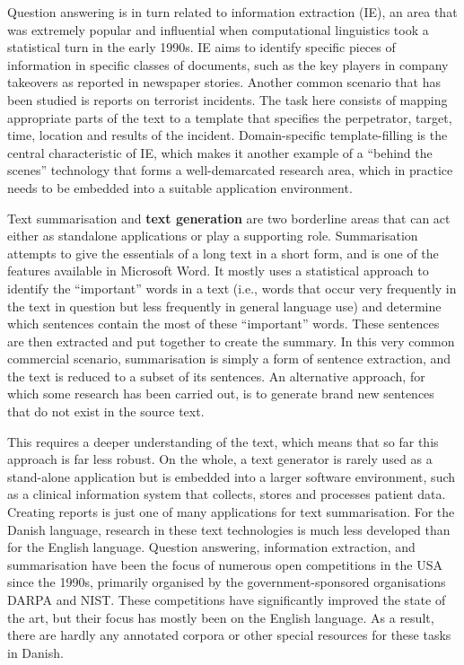 \begin{multicols}{2}
Question answering is in turn related to information extraction (IE), an area that was extremely popular and influential when computational linguistics took a statistical turn in the early 1990s. IE aims to identify specific pieces of information in specific classes of documents, such as the key players in company takeovers as reported in newspaper stories. Another common scenario that has been studied is reports on terrorist incidents. The task here consists of mapping appropriate parts of the text to a template that specifies the perpetrator, target, time, location and results of the incident. Domain-specific template-filling is the central characteristic of IE, which makes it another example of a “behind the scenes” technology that forms a well-demarcated research area, which in practice needs to be embedded into a suitable application environment. 

    Text summarisation and \textbf{text generation} are two borderline areas that can act either as standalone applications or play a supporting role. Summarisation attempts to give the essentials of a long text in a short form, and is one of the features available in Microsoft Word. It mostly uses a statistical approach to identify the “important” words in a text (i.e., words that occur very frequently in the text in question but less frequently in general language use) and determine which sentences contain the most of these “important” words. These sentences are then extracted and put together to create the summary. In this very common commercial scenario, summarisation is simply a form of sentence extraction, and the text is reduced to a subset of its sentences. An alternative approach, for which some research has been carried out, is to generate brand new sentences that do not exist in the source text. 


This requires a deeper understanding of the text, which means that so far this approach is far less robust. On the whole, a text generator is rarely used as a stand-alone application but is embedded into a larger software environment, such as a clinical information system that collects, stores and processes patient data. Creating reports is just one of many applications for text summarisation. 
For the Danish language, research in these text technologies is much less developed than for the Eng\-lish language. Question answering, information extraction, and summarisation have been the focus of numerous open competitions in the USA since the 1990s, primarily organised by the government-sponsored organisations DARPA and NIST. These competitions have significantly improved the state of the art, but their focus has mostly been on the English language. As a result, there are hardly any annotated corpora or other special resources for these tasks in Danish. 


\end{multicols}
